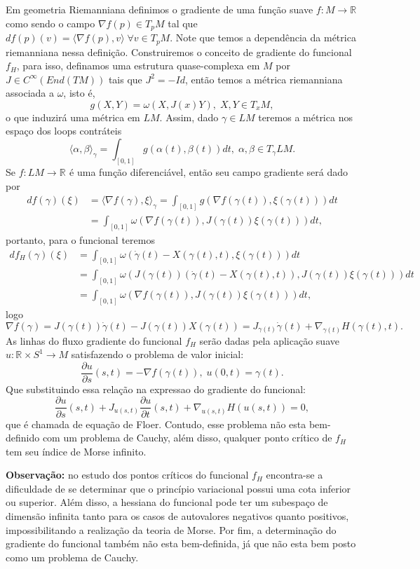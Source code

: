 \documentclass[12pt]{book}
\newcommand{\dparcial}[2]{\frac{\partial #1}{\partial #2}}
\newcommand{\iprod}[2]{\langle #1, #2 \rangle}
\newcommand{\real}[1]{\mathbb{R}^{#1}}
\newcommand{\vermelho}[1]{{\color{red}#1}}
\begin{document}
	Em geometria Riemanniana definimos o gradiente de uma função suave $f:M \to \real{}$ como sendo o campo $\nabla f(p) \in T_{p}M$ tal que $df(p)(v) = \iprod{ \nabla f(p)}{v}\; \forall v \in T_{p}M$. Note que temos a dependência da métrica riemanniana nessa definição. Construiremos o conceito de gradiente do funcional $f_{H}$, para isso, definamos uma estrutura quase-complexa em $M$ por $J \in C^{\infty}(End(TM))$ tais que $J^{2} = -Id$, então temos a métrica riemanniana associada a $\omega$, isto é,
	$$
	g(X, Y)= \omega(X, J(x)Y), \; X,Y \in T_{x}M,
	$$
	o que induzirá uma métrica em $LM$. Assim, dado $\gamma \in LM$ teremos a métrica nos espaço dos loops contráteis
	$$
	\iprod{\alpha}{\beta}_{\gamma} = \int_{[0,1]}g(\alpha(t), \beta(t))dt, \; \alpha, \beta \in T_{\gamma}LM.
	$$
	Se $f: LM \to \real{}$ é uma função diferenciável, então seu campo gradiente será dado por 
	$$
	\begin{aligned}
	df(\gamma)(\xi) &= \iprod{\nabla f(\gamma)}{\xi}_{\gamma} = \int_{[0,1]}g(\nabla f(\gamma(t)), \xi(\gamma(t)))dt
	\\
	&=\int_{[0,1]} \omega(\nabla f(\gamma(t)), J(\gamma(t))\xi(\gamma(t)))dt,
	\end{aligned}
	$$
	portanto, para o funcional teremos
	$$
	\begin{aligned}
		df_{H}(\gamma)(\xi) 
		&=  \int_{[0,1]} \omega(\dot{\gamma}(t) - X(\gamma(t), t), \xi(\gamma(t)))dt
		\\
		&= \int_{[0,1]} \omega(J(\gamma(t))(\dot{\gamma}(t) - X(\gamma(t), t)), J(\gamma(t))\xi(\gamma(t)))dt
		\\
		&= \int_{[0,1]} \omega(\nabla f(\gamma(t)), J(\gamma(t))\xi(\gamma(t)))dt,
	\end{aligned}
	$$
	logo 
	$$
	\nabla f(\gamma) = J(\gamma(t))\dot{\gamma}(t) - J(\gamma(t)) X(\gamma(t)) =J_{\gamma(t)}\dot{\gamma}(t) + \nabla_{\gamma(t)}H(\gamma(t), t).  
	$$
	As linhas do fluxo gradiente do funcional $f_{H}$ serão dadas pela aplicação suave $u : \real{} \times S^{1} \to M$ satisfazendo o problema de valor inicial:
	$$
	\dparcial{u}{s}(s,t) = -\nabla f(\gamma(t)), \; u(0,t) = \gamma(t).
	$$
	Que substituindo essa relação na expressao do gradiente do funcional:
	$$
	\dparcial{u}{s}(s,t) + J_{u(s,t)}\dparcial{u}{t}(s,t) + \nabla_{u(s,t)}H(u(s,t))=0, 
	$$
	que é chamada de equação de Floer. Contudo, esse problema não esta bem-definido com um problema de Cauchy, além disso, qualquer ponto crítico de $f_{H}$ tem seu índice de Morse infinito.
	
	\textbf{Observação:} no estudo dos pontos críticos do funcional $f_{H}$ encontra-se a dificuldade de se determinar que o princípio variacional possui uma cota inferior ou superior. Além disso, a hessiana do funcional pode ter um subespaço de dimensão infinita tanto para os casos de autovalores negativos quanto positivos, impossibilitando a realização da teoria de Morse. Por fim, \vermelho{a determinação do gradiente do funcional também não esta bem-definida, já que não esta bem posto como um problema de Cauchy.}
	
\end{document}
